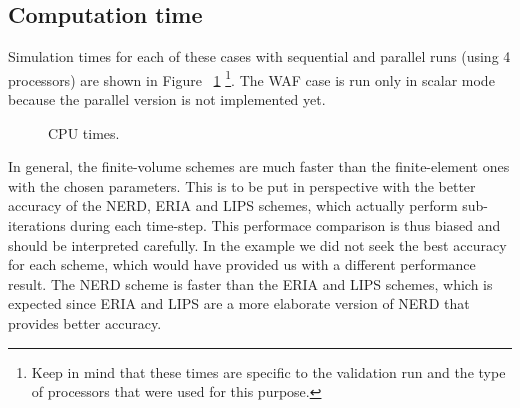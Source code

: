 \subsection{Computation time}

Simulation times for each of these cases with sequential and parallel runs
(using 4 processors) are shown in Figure ~\ref{fig:thacker:cputime}
\footnote{Keep in mind that these times
are specific to the validation run and the type of processors that were used for this purpose.}.
The WAF case is run only in scalar mode because the parallel version is not
implemented yet.

\begin{figure}[h!]
  \centering
  \caption{CPU times.}
  \label{fig:thacker:cputime}
\end{figure}

In general, the finite-volume schemes are much faster than the finite-element
ones with the chosen parameters.
This is to be put in perspective with the better accuracy of the NERD, ERIA
and LIPS
schemes, which actually perform sub-iterations during each time-step.
This performace comparison is thus biased and should be interpreted carefully.
In the example we did not seek the best accuracy for each scheme,
which would have provided us with a different performance result.
The NERD scheme is faster than the ERIA and LIPS schemes, which is expected
since ERIA and LIPS are
a more elaborate version of NERD that provides better accuracy.


